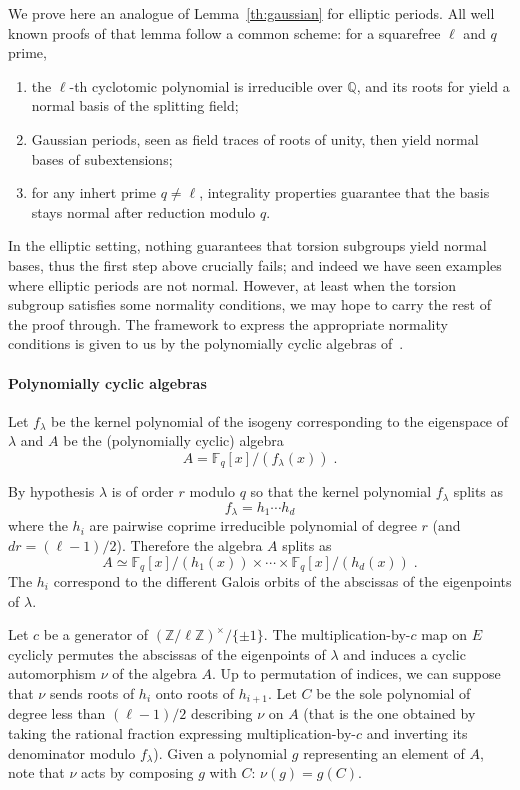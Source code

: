 \documentclass[12pt]{article}
\theoremstyle{plain}
\theoremstyle{definition}
\def\Q{\ensuremath{\mathbb{Q}}}
\def\Z{\ensuremath{\mathbb{Z}}}
\def\F{\ensuremath{\mathbb{F}}}
\begin{document}
We prove here an analogue of Lemma~\ref{th:gaussian} for elliptic
periods. %
All well known proofs of that lemma follow a common scheme: for a
squarefree $\ell$ and $q$ prime,
\begin{enumerate}
\item the $\ell$-th cyclotomic polynomial is irreducible over $\Q$,
  and its roots for yield a normal basis of the splitting field;
\item Gaussian periods, seen as field traces of roots of unity,
then yield normal bases of subextensions;
\item for any inhert prime $q \neq \ell$, integrality properties
  guarantee that the basis stays normal after reduction modulo $q$.
\end{enumerate}

In the elliptic setting, nothing guarantees that torsion subgroups
yield normal bases, thus the first step above crucially fails; and
indeed we have seen examples where elliptic periods are not normal. %
However, at least when the torsion subgroup satisfies some normality
conditions, we may hope to carry the rest of the proof through. %
The framework to express the appropriate normality conditions is given
to us by the polynomially cyclic algebras of~\cite{Mihailescu2010825}.

\paragraph{Polynomially cyclic algebras}
Let $f_\lambda$ be the kernel polynomial of the isogeny corresponding
to the eigenspace of $\lambda$ and $A$ be the (polynomially cyclic)
algebra
\[
A = \F_q[x]/(f_\lambda(x)) \; .
\]

By hypothesis $\lambda$ is of order $r$ modulo $q$ so that
the kernel polynomial $f_\lambda$ splits as
\[
f_\lambda = h_1 \cdots h_d
\]
where the $h_i$ are pairwise coprime irreducible polynomial of degree $r$
(and $d r = (\ell-1)/2$).
Therefore the algebra $A$ splits as
\[
A \simeq \F_q[x]/(h_1(x)) \times \cdots \times \F_q[x]/(h_d(x)) \; .
\]
The $h_i$ correspond to the different Galois orbits of the abscissas
of the eigenpoints of $\lambda$.

Let $c$ be a generator of $(\Z/\ell\Z)^{\times}/\{\pm 1\}$.
The multiplication-by-$c$ map on $E$ cyclicly permutes the
abscissas of the eigenpoints of $\lambda$ and
induces a cyclic automorphism $\nu$ of the algebra $A$.
Up to permutation of indices, we can suppose that $\nu$
sends roots of $h_i$ onto roots of $h_{i+1}$.
Let $C$ be the sole polynomial of degree less than $(\ell-1)/2$
describing $\nu$ on $A$ (that is the one obtained by taking the
rational fraction expressing multiplication-by-$c$ and inverting
its denominator modulo $f_\lambda$).
Given a polynomial $g$ representing an element of $A$, note that
$\nu$ acts by composing $g$ with $C$: $\nu(g) = g(C)$.
\end{document}
